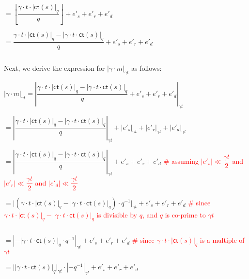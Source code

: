 $=  \left\lfloor\dfrac{\gamma \cdot t\cdot |\textsf{ct}(s)|_q}{q}\right\rfloor + e'_s + e'_r + e'_d$ 

$= \dfrac{\gamma \cdot t\cdot |\textsf{ct}(s)|_q -  |\gamma \cdot t\cdot \textsf{ct}(s)|_q}{q} + e'_s + e'_r + e'_d$ 

$ $

Next, we derive the expression for $|\gamma \cdot m|_{\gamma t}$ as follows:

$|\gamma \cdot m|_{\gamma t} = \left|\dfrac{\gamma\cdot t\cdot |\textsf{ct}(s)|_q - |\gamma\cdot t\cdot \textsf{ct}(s)|_q}{q} + e'_s + e'_r + e'_d\right|_{\gamma t}$

$= \left|\dfrac{\gamma\cdot t\cdot |\textsf{ct}(s)|_q -  |\gamma\cdot t\cdot \textsf{ct}(s)|_q}{q}\right|_{\gamma t} + |e'_s|_{\gamma t} + |e'_r|_{\gamma t} + |e'_d|_{\gamma t}$

$= \left|\dfrac{\gamma\cdot t\cdot |\textsf{ct}(s)|_q -  |\gamma\cdot t\cdot \textsf{ct}(s)|_q}{q}\right|_{\gamma t} + e'_s + e'_r + e'_d$ \textcolor{red}{ \# assuming $|e'_s| \ll \dfrac{\gamma t}{2}$ and $|e'_r| \ll \dfrac{\gamma t}{2}$ and $|e'_d| \ll \dfrac{\gamma t}{2}$}

$= \Big|(\gamma\cdot t\cdot |\textsf{ct}(s)|_q -  |\gamma\cdot t\cdot \textsf{ct}(s)|_q)\cdot q^{-1}\Big|_{\gamma t} + e'_s + e'_r + e'_d$  \textcolor{red}{ \# since $\gamma\cdot t\cdot |\textsf{ct}(s)|_q - |\gamma\cdot t\cdot \textsf{ct}(s)|_q$ is divisible by $q$, and $q$ is co-prime to $\gamma t$}

$ $

$= \left|-  |\gamma\cdot t\cdot \textsf{ct}(s)|_q\cdot q^{-1}\right|_{\gamma t} + e'_s + e'_r + e'_d$ \textcolor{red}{ \# since $\gamma \cdot t\cdot |\textsf{ct}(s)|_q$ is a multiple of $\gamma t$}

$= \Big||\gamma\cdot t\cdot \textsf{ct}(s)|_q\Big|_{\gamma t} \cdot |-q^{-1}|_{\gamma t} + e'_s + e'_r + e'_d$




